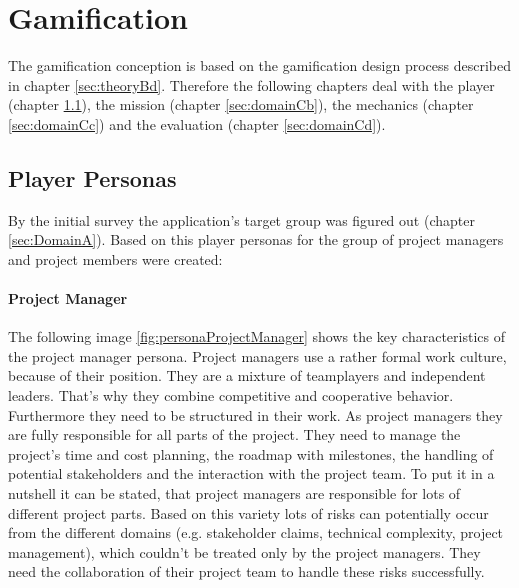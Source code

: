 \newpage

\section{Gamification}
\label{sec:domainC}


The gamification conception is based on the gamification design process described in chapter \ref{sec:theoryBd}. Therefore the following chapters deal with the player (chapter \ref{sec:domainCa}), the mission (chapter \ref{sec:domainCb}), the mechanics (chapter \ref{sec:domainCc}) and the evaluation (chapter \ref{sec:domainCd}).

\subsection{Player Personas}
\label{sec:domainCa}

By the initial survey the application's target group was figured out (chapter \ref{sec:DomainA}). Based on this player personas for the group of project managers and project members were created:

\newpage

\paragraph*{Project Manager}

The following image \ref{fig:personaProjectManager} shows the key characteristics of the project manager persona.
Project managers use a rather formal work culture, because of their position. They are a mixture of teamplayers and independent leaders. That's why they combine competitive and cooperative behavior. Furthermore they need to be structured in their work.
As project managers they are fully responsible for all parts of the project. They need to manage the project's time and cost planning, the roadmap with milestones, the handling of potential stakeholders and the interaction with the project team. To put it in a nutshell it can be stated, that project managers are responsible for lots of different project parts. Based on this variety lots of risks can potentially occur from the different domains (e.g. stakeholder claims, technical complexity, project management), which couldn't be treated only by the project managers. They need the collaboration of their project team to handle these risks successfully.

